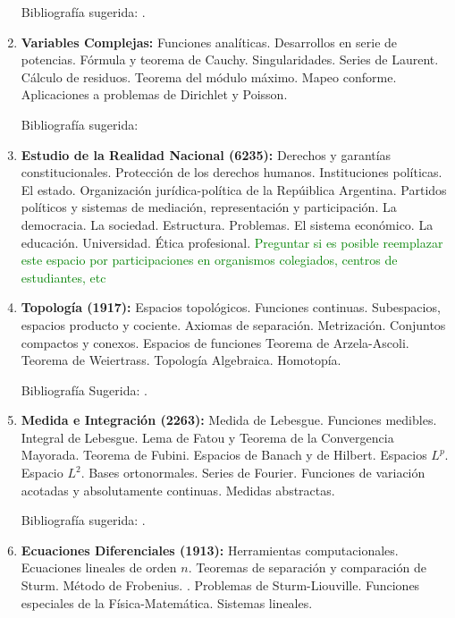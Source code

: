 \documentclass[a4paper, 12pt]{article}
\begin{document}
\begin{enumerate}
Bibliografía sugerida: \cite{roederer, sears}.


\item\textbf{Variables Complejas:}
Funciones analíticas. Desarrollos en serie de potencias. Fórmula
y teorema de Cauchy. Singularidades. Series de Laurent. Cálculo de
residuos. Teorema del módulo máximo. Mapeo conforme. Aplicaciones a problemas de Dirichlet y Poisson.

Bibliografía sugerida: \cite{ahlfors, churchill,conway}



\item\textbf{Estudio de la Realidad Nacional (6235):} Derechos y garantías constitucionales. Protección de los derechos humanos. Instituciones políticas.
El estado. Organización jurídica-política de la Repúiblica Argentina. Partidos políticos y sistemas de
mediación, representación y participación. La democracia. La sociedad. Estructura. Problemas. El
sistema económico. La educación. Universidad. Ética profesional.
\textcolor{green}{Preguntar si es posible reemplazar este espacio por participaciones en organismos colegiados, centros de estudiantes, etc}

\item\textbf{Topología (1917):}  Espacios topológicos. Funciones continuas. Subespacios, espacios producto
y cociente. Axiomas de separación. Metrización.
Conjuntos compactos y conexos. Espacios de funciones Teorema de Arzela-Ascoli. Teorema de Weiertrass. 
 Topología Algebraica. Homotopía.

Bibliografía Sugerida: \cite{dugundji, kelley,
munkres, morris1989topology,  JohnMcCleary84,StefanWaldmann87,JohnB.Conway251, RobertAConover507}.


\item\textbf{Medida e Integración (2263):}  Medida de Lebesgue. Funciones medibles.
Integral de
Lebesgue. Lema de Fatou y Teorema de la Convergencia Mayorada.
Teorema de Fubini. Espacios de Banach y de Hilbert. Espacios
$L^p$. Espacio  $L^2$. Bases ortonormales. Series de Fourier.
Funciones de variación acotadas y absolutamente continuas. Medidas abstractas. 

Bibliografía sugerida: \cite{favazo, loeve, rudin, EliasM.Stein105,TerenceTao123,A.N.Kolmogorov682,DavidM.Bressoud121,wheeden2015measure}.


\item\textbf{Ecuaciones Diferenciales (1913):} Herramientas computacionales.  Ecuaciones lineales de orden $n$. Teoremas de separación y comparación de Sturm. Método de Frobenius. . Problemas de Sturm-Liouville. Funciones especiales de la Física-Matemática.  Sistemas lineales. 


\end{enumerate}
\end{document}
